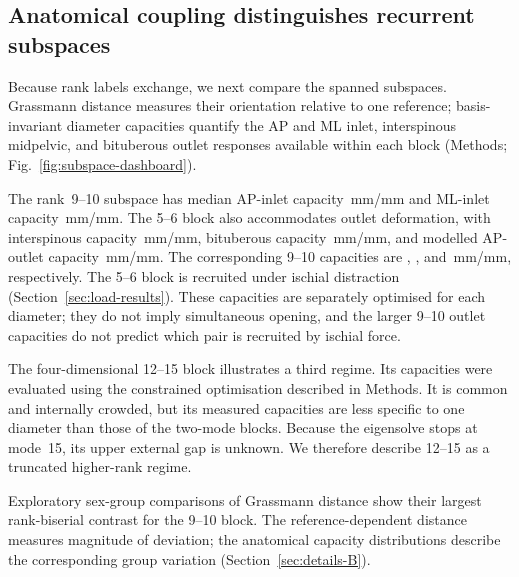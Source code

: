 \documentclass[pdflatex,sn-basic]{sn-jnl}
\newcommand{\StdTableFont}{\footnotesize}
\newcommand{\StdTableInput}[1]{\begingroup\setlength{\tabcolsep}{4pt}\resizebox{\linewidth}{!}{}\endgroup}
\begin{document}
\begin{table}[!t]
\centering
\caption{Recurrent clustered rank blocks above the 3\% prevalence floor. External separation is reported as (---) for blocks reaching the 15-mode truncation boundary}
\label{tab:clusters}
\StdTableFont
\StdTableInput{clusters.tex}
\end{table}


\FloatBarrier
\subsection{Anatomical coupling distinguishes recurrent subspaces}
\label{sec:subspace-results}

Because rank labels exchange, we next compare the spanned subspaces. Grassmann distance measures their orientation relative to one reference; basis-invariant diameter capacities quantify the AP and ML inlet, interspinous midpelvic, and bituberous outlet responses available within each block (Methods; Fig.~\ref{fig:subspace-dashboard}).

The rank~9--10 subspace has median AP-inlet capacity \BlockNineTenAP\,mm/mm and ML-inlet capacity \BlockNineTenML\,mm/mm. The 5--6 block also accommodates outlet deformation, with interspinous capacity \BlockFiveSixBIS\,mm/mm, bituberous capacity \BlockFiveSixBIT\,mm/mm, and modelled AP-outlet capacity \BlockFiveSixOUTLETAP\,mm/mm. The corresponding 9--10 capacities are \BlockNineTenBIS, \BlockNineTenBIT, and \BlockNineTenOUTLETAP\,mm/mm, respectively. The 5--6 block is recruited under ischial distraction (Section~\ref{sec:load-results}). These capacities are separately optimised for each diameter; they do not imply simultaneous opening, and the larger 9--10 outlet capacities do not predict which pair is recruited by ischial force.

The four-dimensional 12--15 block illustrates a third regime. Its capacities were evaluated using the constrained optimisation described in Methods.
It is common and internally crowded, but its measured capacities are less specific to one diameter than those of the two-mode blocks. Because the eigensolve stops at mode~15, its upper external gap is unknown. We therefore describe 12--15 as a truncated higher-rank regime.


Exploratory sex-group comparisons of Grassmann distance show their largest rank-biserial contrast for the 9--10 block. The reference-dependent distance measures magnitude of deviation; the anatomical capacity distributions describe the corresponding group variation (Section~\ref{sec:details-B}).
\end{document}
